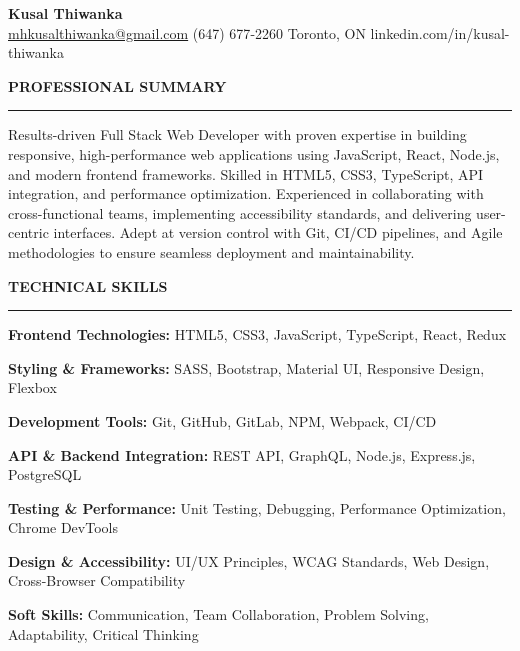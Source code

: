 \documentclass[10pt,letterpaper]{article}
\begin{document}
\begin{center}
{\LARGE\textbf{Kusal Thiwanka}}\\[3pt]
\href{mailto:mhkusalthiwanka@gmail.com}{mhkusalthiwanka@gmail.com}\hspace{2em}%
(647) 677{-}2260\hspace{2em}%
Toronto, ON\hspace{2em}
linkedin.com/in/kusal-thiwanka
\end{center}

\vspace{6pt}

\textbf{PROFESSIONAL SUMMARY}\\[-8pt]
\noindent\rule{\textwidth}{1pt}

\vspace{-2pt}

Results-driven Full Stack Web Developer with proven expertise in building responsive, high-performance web applications using JavaScript, React, Node.js, and modern frontend frameworks. Skilled in HTML5, CSS3, TypeScript, API integration, and performance optimization. Experienced in collaborating with cross-functional teams, implementing accessibility standards, and delivering user-centric interfaces. Adept at version control with Git, CI/CD pipelines, and Agile methodologies to ensure seamless deployment and maintainability.

\vspace{8pt}

\textbf{TECHNICAL SKILLS}\\[-8pt]
\noindent\rule{\textwidth}{1pt}

\vspace{-2pt}

\textbf{Frontend Technologies:} HTML5, CSS3, JavaScript, TypeScript, React, Redux

\textbf{Styling \& Frameworks:} SASS, Bootstrap, Material UI, Responsive Design, Flexbox

\textbf{Development Tools:} Git, GitHub, GitLab, NPM, Webpack, CI/CD

\textbf{API \& Backend Integration:} REST API, GraphQL, Node.js, Express.js, PostgreSQL

\textbf{Testing \& Performance:} Unit Testing, Debugging, Performance Optimization, Chrome DevTools

\textbf{Design \& Accessibility:} UI/UX Principles, WCAG Standards, Web Design, Cross-Browser Compatibility

\textbf{Soft Skills:} Communication, Team Collaboration, Problem Solving, Adaptability, Critical Thinking
\end{document}
